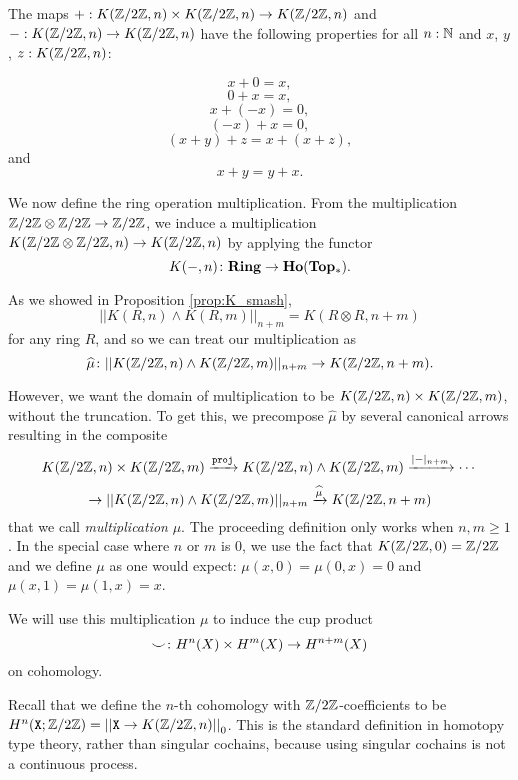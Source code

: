\documentclass{amsart}
\begin{document}
\begin{proposition}\cite[Prop. 5.1.4]{brunerie:thesis}\label{prop:abeliangpops}
	The maps $ +: K(\mathbb{Z}/2\mathbb{Z},n) \times K(\mathbb{Z}/2\mathbb{Z},n) \to K(\mathbb{Z}/2\mathbb{Z},n) $ and $-: K(\mathbb{Z}/2\mathbb{Z},n)  \to K(\mathbb{Z}/2\mathbb{Z},n) $ have the following properties for all $n:\mathbb{N}$ and $x$, $y$, $z:K(\mathbb{Z}/2\mathbb{Z},n)$:
	
	\[x+0=x,\]
	\[0+x=x,\]
	\[x+(-x)=0,\]
	\[(-x)+x=0,\]
	\[(x+y)+z=x+(x+z),\]
	and
	\[x+y=y+x.\]
	
	\end{proposition}



We now define the ring operation multiplication. From the multiplication
$ \mathbb{Z}/2\mathbb{Z} \otimes \mathbb{Z}/2\mathbb{Z} \to \mathbb{Z}/2\mathbb{Z} $, we induce a multiplication
$ K(\mathbb{Z}/2\mathbb{Z} \otimes \mathbb{Z}/2\mathbb{Z}, n)\to K(\mathbb{Z}/2\mathbb{Z}, n) $ by applying the
functor
\[
K(-,n) \colon \mathbf{Ring} \to \mathbf{Ho}(\mathbf{Top_\ast}).
\]

As we showed in Proposition \ref{prop:K_smash}, 
\[
|| K(R,n) \wedge K(R,m) ||_{n+m} =
K (R \otimes R, n+m )
\]
for any ring $ R $, and so we can treat our multiplication as
\[
\widehat{\mu} \colon
|| K(\mathbb{Z}/2\mathbb{Z},n) \wedge K(\mathbb{Z}/2\mathbb{Z},m) ||_{n+m} \to K(\mathbb{Z}/2\mathbb{Z}, n+m).
\]


However, we want the domain of multiplication
to be $ K ( \mathbb{Z}/2\mathbb{Z} , n) \times K( \mathbb{Z}/2\mathbb{Z}, m) $, without the truncation. To get this, we
precompose $ \widehat{\mu} $ by several canonical arrows
resulting in the composite
\[
K (\mathbb{Z}/2\mathbb{Z} , n) \times K(\mathbb{Z}/2\mathbb{Z}, m)
\xrightarrow{\mathtt{proj}}
K (\mathbb{Z}/2\mathbb{Z} , n) \wedge K(\mathbb{Z}/2\mathbb{Z}, m)
\xrightarrow{|-|_{n+m}}\cdots\]
\[\rightarrow|| K (\mathbb{Z}/2\mathbb{Z} , n) \wedge K(\mathbb{Z}/2\mathbb{Z}, m) ||_{n+m}
\xrightarrow{\widehat{\mu}}
K(\mathbb{Z}/2\mathbb{Z}, n+m)
\]
that we call \emph{multiplication} $ \mu $. The proceeding definition only works when $n,m\geq 1$. In the special case where $n$ or $m$ is 0, we use the fact that $K(\mathbb{Z}/2\mathbb{Z},0)=\mathbb{Z}/2\mathbb{Z}$ and we define $\mu$ as one would expect: $\mu(x,0)=\mu(0,x)=0$ and $\mu(x,1)=\mu(1,x)=x$. 

We will use this multiplication $\mu$ to induce
the cup product
\[
\smile \colon H^n(X) \times H^m(X) \to H^{n+m}(X)
\]
on cohomology. 



Recall that we define the $ n $-th cohomology
with $ \mathbb{Z}/2\mathbb{Z} $-coefficients to be
$H^n(\mathtt{X};\mathbb{Z}/2\mathbb{Z})= \left| \left| \mathtt{X}\rightarrow K(\mathbb{Z}/2\mathbb{Z},n)\right| \right|_0$. This is the
standard definition in homotopy type theory, rather than
singular cochains, because using singular cochains is not
a continuous process. 
\end{document}
